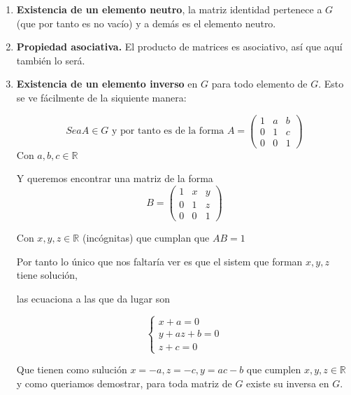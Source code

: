 \documentclass[12pt]{article}
\begin{document}
\begin{enumerate}
    \item \textbf{Existencia de un elemento neutro}, la matriz identidad pertenece a $G$ 
    (que por tanto es no vacío) y a demás es el elemento neutro. 
    \item \textbf{Propiedad asociativa.} El producto de matrices es asociativo, así que aquí 
    también lo será. 
    \item \textbf{Existencia de un elemento inverso} en $G$ para todo elemento de $G$. 
    Esto se ve fácilmente de la siquiente manera: 

    \begin{equation*}
        Sea A \in G \text{ y por tanto es de la forma } A = 
        \left(
        \begin{matrix}
            1 & a & b \\
            0 & 1 & c \\
            0 & 0 & 1
        \end{matrix}
        \right)
    \end{equation*}
    Con $a,b,c\in \mathbb{R}$

    Y queremos encontrar una matriz de la forma 
    \begin{equation*}
        B= \left(
        \begin{matrix}
            1 & x & y \\
            0 & 1 & z \\
            0 & 0 & 1
        \end{matrix}
        \right)
    \end{equation*}

    Con $x,y,z \in \mathbb{R}$ (incógnitas) que cumplan que $AB = 1$

    Por tanto lo único que nos faltaría ver es que el sistem que forman $x,y,z$ tiene solución, 
    
    las ecuaciona a las que da lugar son 

  \begin{equation*}
    \left\{
      \begin{array}{l}
         x + a = 0 \\
         y + az + b = 0 \\
         z +c = 0
      \end{array}
      \right.
  \end{equation*}


Que tienen como sulución $x = -a, z = -c, y = ac-b$
que cumplen $x,y,z \in \mathbb{R}$ y como queriamos demostrar, 
para toda matriz de $G$ existe su inversa en $G.$

\end{enumerate}
\end{document}
